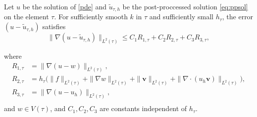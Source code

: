 \documentclass[times]{nlaauth}
\numberwithin{equation}{section}
\begin{document}
\begin{lem}  \label{lem:elemerr}
Let $u$ be the solution of \eqref{pde} and $\widetilde u_{\tau,h}$ be the post-proccessed solution \eqref{eq:ppsol} on the element $\tau$. For sufficiently smooth $k$ in $\tau$ and sufficiently small $h_\tau$, the error $(u - \widetilde u_{\tau, h}) $ satisfies 
$$
\| \nabla( u - \widetilde u_{\tau, h} ) \|_{L^2(\tau)} \leq C_1 R_{1,\tau} + C_2 R_{2,\tau} + C_3R_{3,\tau},
$$

\noindent
where
\begin{equation*}
\begin{aligned}
R_{1,\tau} & = \| \nabla( u - w ) \|_{L^2(\tau)}, \\
R_{2,\tau} & = h_\tau \big(  \| f \|_{L^2(\tau)} +  \| \nabla w \|_{L^2(\tau)}  + \| \boldsymbol{v} \|_{L^2(\tau)} + \| \nabla \cdot (u_h\boldsymbol{v}) \|_{L^2(\tau)}  \big), \\
R_{3,\tau} & = \| \nabla(u - u_h) \|_{L^2(\tau)},\\
\end{aligned}
\end{equation*}
and $w \in V(\tau)$, and $C_1, C_2, C_3$ are constants independent of $h_\tau$.

\end{lem}
\end{document}
